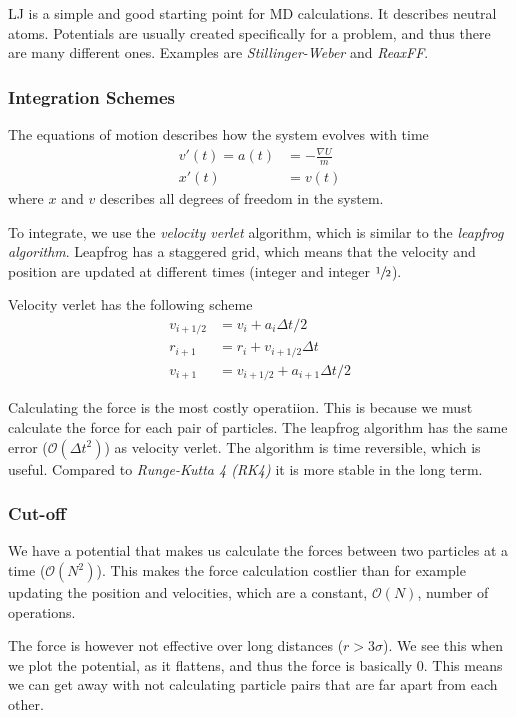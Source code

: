 \documentclass[11pt]{article}
\numberwithin{equation}{section}
\numberwithin{figure}{section}
\newcommand{\mc}[1]{\mathcal{#1}}
\newcommand{\ita}[1]{\textit{#1}}
\begin{document}
LJ is a simple and good starting point for MD calculations.
It describes neutral atoms.
Potentials are usually created specifically for
a problem, and thus there are many different ones.
Examples are \ita{Stillinger-Weber} and \ita{ReaxFF}.

\subsubsection{Integration Schemes} 
The equations of motion describes
how the system evolves with time
\begin{align}
    v'(t) = a(t) &= -\frac{\nabla U}{m}\\
    x'(t) &= v(t)
\end{align}
where $x$ and $v$ describes all degrees of freedom in the
system. 

To integrate, we use the \ita{velocity verlet} algorithm,
which is similar to the \ita{leapfrog algorithm}.
Leapfrog has a staggered grid, which means that the
velocity and position are updated at different times
(integer and integer $\sfrac{1}{2}$).

Velocity verlet has the following scheme
\begin{align}
    v_{i+1/2} &= v_i + a_i \Delta t/2\\
    r_{i+1} &= r_i + v_{i+1/2}\Delta t\\
    v_{i+1} &= v_{i+1/2} + a_{i+1}\Delta t/2
\end{align}

Calculating the force is the most costly
operatiion. This is because we must calculate the
force for each pair of particles.
The leapfrog algorithm has the same error 
($\mc O (\Delta t^2)$) as velocity verlet. 
The algorithm is time reversible, which is useful.
Compared to \ita{Runge-Kutta 4 (RK4)} it is more
stable in the long term.

\subsubsection{Cut-off} 

We have a potential that makes us calculate the forces between
two particles at a time ($\mc O(N^2)$). 
This makes the force calculation
costlier than for example updating the position and velocities,
which are a constant, $\mc O(N)$, number of operations.

The force is however not effective over long distances 
($r>3\sigma$). We see this when we plot the potential,
as it flattens, and thus the force is basically 0.
This means we can get away with not calculating particle
pairs that are far apart from each other.
\end{document}
